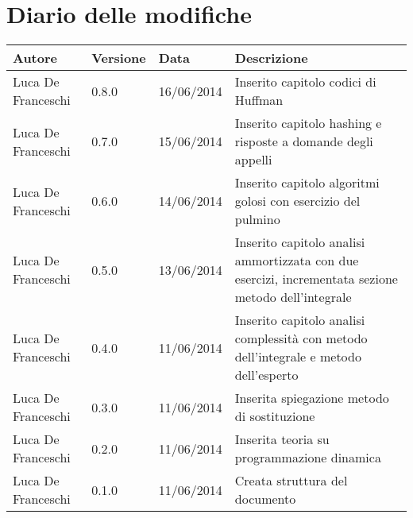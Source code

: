 \section*{Diario delle modifiche}

\begin{center}

	\begin{table}[htpd]
		\begin{tabular}{| l | l | l | p{50mm} |}
			\hline
			\hline
			\textbf{Autore} & \textbf{Versione} & \textbf{Data} & \textbf{Descrizione} \\
			\hline
			\hline
			Luca De Franceschi & 0.8.0 & 16/06/2014 & Inserito capitolo codici di Huffman \\ \hline
			Luca De Franceschi & 0.7.0 & 15/06/2014 & Inserito capitolo hashing e risposte a domande degli appelli \\ \hline
			Luca De Franceschi & 0.6.0 & 14/06/2014 & Inserito capitolo algoritmi golosi con esercizio del pulmino \\ \hline
			Luca De Franceschi & 0.5.0 & 13/06/2014 & Inserito capitolo analisi ammortizzata con due esercizi, incrementata sezione metodo dell'integrale \\ \hline
			Luca De Franceschi & 0.4.0 & 11/06/2014 & Inserito capitolo analisi complessità con metodo dell'integrale e metodo dell'esperto \\ \hline
			Luca De Franceschi & 0.3.0 & 11/06/2014 & Inserita spiegazione metodo di sostituzione \\ \hline
			Luca De Franceschi & 0.2.0 & 11/06/2014 & Inserita teoria su programmazione dinamica \\ \hline
			Luca De Franceschi & 0.1.0 & 11/06/2014 & Creata struttura del documento \\ \hline
		\end{tabular}
	\end{table}
	
\end{center}